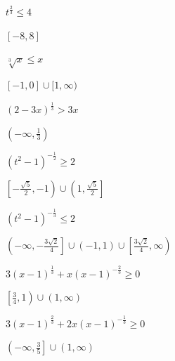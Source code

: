 \documentclass{ximera}
\begin{document}
\begin{question}
\begin{problem}
$t^{\frac{2}{3}} \leq 4$ 

\begin{solution}
$[-8,8]$    
\end{solution}
\end{problem}

\begin{problem}
$\sqrt[3]{x} \leq x$   

\begin{solution}
$[-1, 0] \cup [1, \infty)$  
\end{solution}
\end{problem}

\begin{problem}
$(2-3x)^{\frac{1}{3}} > 3x$  

\begin{solution}
$\left(-\infty, \frac{1}{3} \right)$
\end{solution}
\end{problem}

\begin{problem}
$(t^2-1)^{-\frac{1}{2}} \geq 2$  

\begin{solution}
$\left[ -\frac{\sqrt{5}}{2}, -1\right) \cup \left(1, \frac{\sqrt{5}}{2}\right]$
\end{solution}
\end{problem}

\begin{problem}
$(t^2-1)^{-\frac{1}{3}} \leq 2$  

\begin{solution}
$\left(-\infty, -\frac{3\sqrt{2}}{4} \right] \cup (-1,1) \cup \left[ \frac{3\sqrt{2}}{4}, \infty \right)$
\end{solution}
\end{problem}

\begin{problem}
$3(x-1)^{\frac{1}{3}} +x (x-1)^{-\frac{2}{3}} \geq 0$ 

\begin{solution}
$\left[ \frac{3}{4}, 1\right) \cup (1, \infty)$
\end{solution}
\end{problem}

\begin{problem}
$3(x-1)^{\frac{2}{3}} +2x (x-1)^{-\frac{1}{3}} \geq 0$ 

\begin{solution}
$\left( -\infty, \frac{3}{5} \right] \cup (1, \infty)$
\end{solution}
\end{problem}


\end{question}
\end{document}
